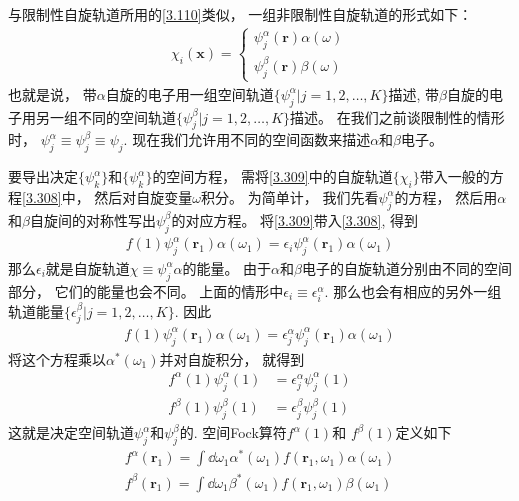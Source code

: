 与限制性自旋轨道所用的\autoref{3.110}类似，
一组非限制性自旋轨道的形式如下：
\begin{align}\label{3.309}
	\chi_i(\mathbf{x}) =
	\begin{cases*}
		\psi_j^\alpha(\mathbf{r})\alpha(\omega)\\
		\psi_j^\beta (\mathbf{r})\beta(\omega)
	\end{cases*}
\end{align}
也就是说，
带$\alpha$自旋的电子用一组空间轨道$\{\psi_j^\alpha |j=1,2,\ldots,K \}$描述, 
带$\beta$自旋的电子用另一组不同的空间轨道$\{\psi_j^\beta |j=1,2,\ldots,K \}$描述。
在我们之前谈限制性的情形时，
$\psi_j^\alpha \equiv \psi_j^\beta \equiv \psi_j$. 
现在我们允许用不同的空间函数来描述$\alpha$和$\beta$电子。


要导出决定$\{\psi_k^\alpha \}$和$\{\psi_k^\alpha \}$的空间方程，
需将\autoref{3.309}中的自旋轨道$\{\chi_i\}$带入一般的\hft 方程\autoref{3.308}中，
然后对自旋变量$\omega$积分。
为简单计，
我们先看$\psi_j^\alpha$的方程，
然后用$\alpha$和$\beta$自旋间的对称性写出$\psi_j^\beta$的对应方程。
将\autoref{3.309}带入\autoref{3.308}, 
得到
\begin{align}\label{3.310}
	f(1)\psi_j^\alpha(\mathbf{r}_1) \alpha(\omega_1) = \epsilon_i \psi_j^\alpha(\mathbf{r}_1) \alpha(\omega_1)
\end{align}
那么$\epsilon_i$就是自旋轨道$\chi\equiv\psi_j^\alpha\alpha$的能量。
由于$\alpha$和$\beta$电子的自旋轨道分别由不同的空间部分，
它们的能量也会不同。
上面的情形中$\epsilon_i\equiv\epsilon^\alpha_i$. 
那么也会有相应的另外一组轨道能量$\{\epsilon_j^\beta | j=1,2,\ldots,K\}$. 
因此
\begin{align}\label{3.311}
	f(1)\psi_j^\alpha(\mathbf{r}_1) \alpha(\omega_1) = \epsilon_j^\alpha \psi_j^\alpha(\mathbf{r}_1) \alpha(\omega_1)
\end{align}
将这个方程乘以$\alpha^*(\omega_1)$并对自旋积分，
就得到
\begin{align}
	f^\alpha(1)\psi_j^\alpha(1) & = \epsilon_j^\alpha \psi_j^\alpha(1) \label{3.312}\\
	f^\beta (1)\psi_j^\beta(1)  & = \epsilon_j^\beta \psi_j^\beta(1)\label{3.313}
\end{align}
这就是决定空间轨道$\psi_j^\alpha$和$\psi_j^\beta$的. 
空间Fock算符$f^\alpha(1)$和 $f^\beta (1)$定义如下
\begin{align}
	f^\alpha(\mathbf{r}_1) = \int\dd\omega_1 \alpha^*(\omega_1) f(\mathbf{r}_1,\omega_1)\alpha(\omega_1) \label{3.314}\\
	f^\beta(\mathbf{r}_1) = \int\dd\omega_1 \beta^*(\omega_1) f(\mathbf{r}_1,\omega_1)\beta(\omega_1) \label{3.315}
\end{align}

